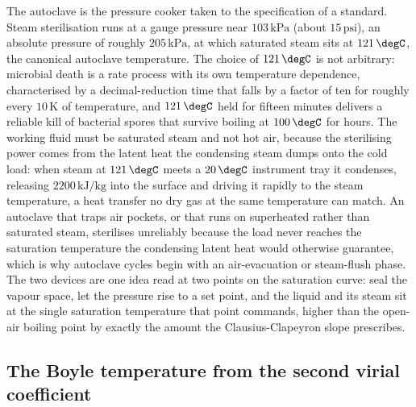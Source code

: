 The autoclave is the pressure cooker taken to the specification of a
standard. Steam sterilisation runs at a gauge pressure near
$103\,\text{kPa}$ (about $15\,\text{psi}$), an absolute pressure of roughly
$205\,\text{kPa}$, at which saturated steam sits at $121\,\degC$, the
canonical autoclave temperature. The choice of $121\,\degC$ is not
arbitrary: microbial death is a rate process with its own temperature
dependence, characterised by a decimal-reduction time that falls by a factor
of ten for roughly every $10\,\si{\kelvin}$ of temperature, and $121\,\degC$
held for fifteen minutes delivers a reliable kill of bacterial spores that
survive boiling at $100\,\degC$ for hours. The working fluid must be
saturated steam and not hot air, because the sterilising power comes from the
latent heat the condensing steam dumps onto the cold load: when steam at
$121\,\degC$ meets a $20\,\degC$ instrument tray it condenses, releasing
$2200\,\text{kJ}/\text{kg}$ into the surface and driving it rapidly to the
steam temperature, a heat transfer no dry gas at the same temperature can
match. An autoclave that traps air pockets, or that runs on superheated
rather than saturated steam, sterilises unreliably because the load never
reaches the saturation temperature the condensing latent heat would
otherwise guarantee, which is why autoclave cycles begin with an
air-evacuation or steam-flush phase. The two devices are one idea read at
two points on the saturation curve: seal the vapour space, let the pressure
rise to a set point, and the liquid and its steam sit at the single
saturation temperature that point commands, higher than the open-air boiling
point by exactly the amount the Clausius-Clapeyron slope prescribes.

\subsection{The Boyle temperature from the second virial coefficient}

